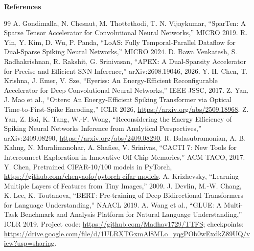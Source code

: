 \documentclass[10pt,a4paper]{article}
\begin{document}
\newpage
{\Large\sffamily\bfseries References}
\renewcommand{\refname}{}
\vspace{-8mm}
\begin{thebibliography}{99}\setlength{\itemsep}{2pt}\small
{} A. Gondimalla, N. Chesnut, M. Thottethodi, T. N. Vijaykumar, ``SparTen: A Sparse Tensor
  Accelerator for Convolutional Neural Networks,'' MICRO 2019.
 R. Yin, Y. Kim, D. Wu, P. Panda, ``LoAS: Fully Temporal-Parallel Dataflow for Dual-Sparse
  Spiking Neural Networks,'' MICRO 2024.
 D. Bawa Venkatesh, S. Radhakrishnan, R. Rakshit, G. Srinivasan, ``APEX: A Dual-Sparsity
  Accelerator for Precise and Efficient SNN Inference,'' arXiv:2608.19046, 2026.
 Y.-H. Chen, T. Krishna, J. Emer, V. Sze, ``Eyeriss: An Energy-Efficient Reconfigurable
  Accelerator for Deep Convolutional Neural Networks,'' IEEE JSSC, 2017.
 Z. Yan, J. Mao et al., ``Otters: An Energy-Efficient Spiking Transformer via Optical
  Time-to-First-Spike Encoding,'' ICLR 2026, \url{https://arxiv.org/abs/2509.18968}.
 Z. Yan, Z. Bai, K. Tang, W.-F. Wong, ``Reconsidering the Energy Efficiency of Spiking Neural
  Networks Inference from Analytical Perspectives,'' arXiv:2409.08290, \url{https://arxiv.org/abs/2409.08290}.
 R. Balasubramonian, A. B. Kahng, N. Muralimanohar, A. Shafiee, V. Srinivas, ``CACTI 7: New
  Tools for Interconnect Exploration in Innovative Off-Chip Memories,'' ACM TACO, 2017.
 Y. Chen, Pretrained CIFAR-10/100 models in PyTorch,
  \url{https://github.com/chenyaofo/pytorch-cifar-models}.
 A. Krizhevsky, ``Learning Multiple Layers of Features from Tiny Images,'' 2009.
 J. Devlin, M.-W. Chang, K. Lee, K. Toutanova, ``BERT: Pre-training of Deep Bidirectional
  Transformers for Language Understanding,'' NAACL 2019.
 A. Wang et al., ``GLUE: A Multi-Task Benchmark and Analysis Platform for Natural Language
  Understanding,'' ICLR 2019.
 Project code: \url{https://github.com/Madhav1729/TTFS}; checkpoints:
  \url{https://drive.google.com/file/d/1ULRXTGxmAl8MLo_yqgPOb0wExdkZ89UQ/view?usp=sharing}.
\end{thebibliography}
\end{document}
